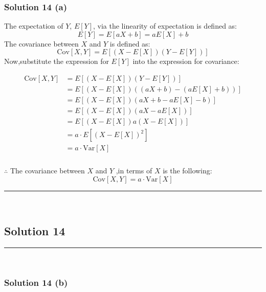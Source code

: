 \documentclass{article}
\begin{document}
\subsubsection*{Solution  14 (a)}
\parbox{\textwidth}{
The expectation of $Y$, $E[Y]$, via the linearity of expectation is defined as:
$$ E[Y] = E[aX + b] = aE[X] + b $$
The covariance between $X$ and $Y$ is defined as:
$$\text{Cov}[X, Y] = E[(X - E[X])(Y - E[Y])]$$
Now,substitute the expression for $E[Y]$ into the expression for covariance:
}
\begin{align*}
\text{Cov}[X, Y] &= E\left[ (X - E[X])(Y - E[Y]) \right] \\
&= E\left[ (X - E[X])((aX + b) - (aE[X] + b)) \right] \\
&= E\left[ (X - E[X])(aX + b - aE[X] - b) \right] \\
&= E\left[ (X - E[X])(aX - aE[X]) \right] \\
&= E\left[ (X - E[X])a(X - E[X]) \right] \\
&= a \cdot E\left[ (X - E[X])^2 \right] \\
&= a \cdot \text{Var}[X]
\end{align*}

\subsubsection*{\normalfont}{$\therefore$ The covariance between $X$ and $Y$ ,in terms of $X$ is the following:}
$$\text{Cov}[X, Y] = a \cdot \text{Var}[X]$$


\noindent\rule{\textwidth}{0.4pt}\\

\newpage
\subsection*{Solution 14}
\noindent\rule{\textwidth}{0.4pt}\\
\subsubsection*{Solution  14 (b)}
\end{document}
